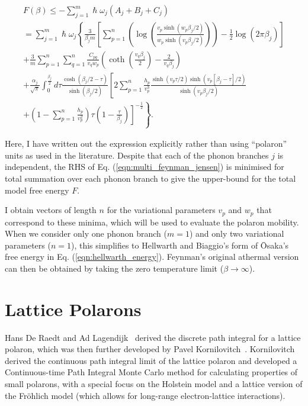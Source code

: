 \begin{equation} \label{eqn:multi_feynman_jensen}
    \begin{gathered}
         F(\beta) \leq -\sum_{j=1}^m \hslash \omega_j \left(A_j + B_j + C_j\right) \\ = \sum_{j=1}^m \hslash \omega_j \left\{ \frac{3}{\beta_j m} \left[ \sum_{p = 1}^n \left( \log\left(\frac{v_{p} \sinh (w_{p} \beta_j / 2)}{w_{p} \sinh (v_{p} \beta_j / 2)}\right) \right) - \frac{1}{2}\log \left(2\pi\beta_j\right) \right] \right. \\ \left. + \frac{3}{m}\sum_{p = 1}^n \sum_{q = 1}^n \frac{C_{pq}}{v_{q} w_{p}} \left( \coth \left(\frac{v_{q}\beta_j}{2}\right) - \frac{2}{v_{q}\beta_j}\right) \right. \\ 
        \left. + \frac{\alpha_j}{\sqrt{\pi}} \int_0^{\frac{\beta_j}{2}} d\tau \frac{\cosh(\beta_j/2 - \tau)}{\sinh(\beta_j/2)} \left[2 \sum_{p=1}^n \frac{h_{p}}{v_{p}^3} \frac{\sinh{(v_{p} \tau/2)\sinh{(v_{p}[\beta_j-\tau]/2)}}}{\sinh(v_{p}\beta_j/2)} \right. \right.\\
        \left. \left. + \left(1 - \sum_{p = 1}^n \frac{h_{p}}{v_{p}^2}\right) \tau \left(1 - \frac{\tau}{\beta_j}\right) \right]^{-\frac{1}{2}} \right\} .
    \end{gathered}
\end{equation}

Here, I have written out the expression explicitly rather than using ``polaron'' units as used in the literature. Despite that each of the phonon branches $j$ is independent, the RHS of Eq. (\ref{eqn:multi_feynman_jensen}) is minimised for total summation over each phonon branch to give the upper-bound for the total model free energy $F$. 

I obtain vectors of length $n$ for the variational parameters $v_{p}$ and $w_{p}$ that correspond to these minima, which will be used to evaluate the polaron mobility. When we consider only one phonon branch ($m = 1$) and only two variational parameters ($n = 1$), this simplifies to Hellwarth and Biaggio's form of \=Osaka's free energy in Eq. (\ref{eqn:hellwarth_energy}). Feynman's original athermal version can then be obtained by taking the zero temperature limit ($\beta \rightarrow \infty$).

\section{Lattice Polarons}
\label{sec:3-2}

Hans De Raedt and Ad Lagendijk~\cite{de_raedt_numerical_1983, de_raedt_monte_1985} derived the discrete path integral for a lattice polaron, which was then further developed by Pavel Kornilovitch~\cite{kornilovitch_polaron_1997, kornilovitch_continuous-time_1998, kornilovitch_ground-state_1999, kornilovitch_giant_1999, kornilovitch_band_2000, kornilovitch_feynmans_2004, kornilovitch_path_2007}. Kornilovitch derived the continuous path integral limit of the lattice polaron and developed a Continuous-time Path Integral Monte Carlo method for calculating properties of small polarons, with a special focus on the Holstein model and a lattice version of the Fr\"ohlich model (which allows for long-range electron-lattice interactions).

